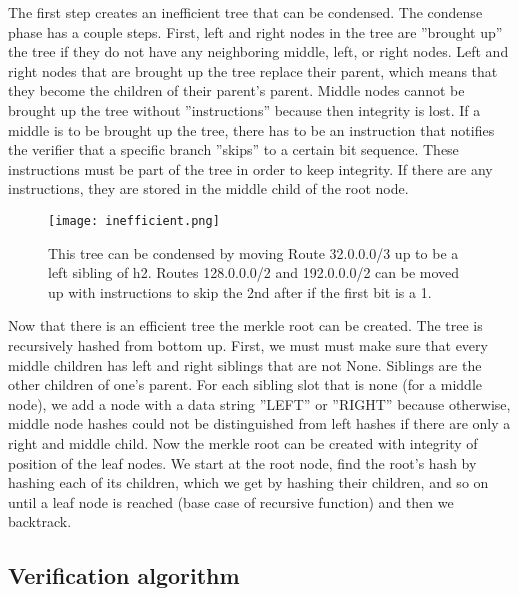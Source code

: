 \documentclass[letterpaper, 10 pt, conference]{ieeeconf}  %
\begin{document}
The first step creates an inefficient tree that can be condensed. The condense phase has a couple steps. First, left and right nodes in the tree are ”brought up” the tree if they do not have any neighboring middle, left, or right nodes. Left and right nodes that are brought up the tree replace their parent, which means that they become the children of their parent’s parent. Middle nodes cannot be brought up the tree without ”instructions” because then integrity is lost. If a middle is to be brought up the tree, there has to be an instruction that notifies the verifier that a specific branch ”skips” to a certain bit sequence. These instructions must be part of the tree in order to keep integrity. If there are any instructions, they are stored in the middle child of the root node. 

\begin{figure}[!ht]
	\centering
	\texttt{[image: inefficient.png]}
    \caption{This tree can be condensed by moving Route 32.0.0.0/3 up to be a left sibling of h2. Routes 128.0.0.0/2 and 192.0.0.0/2 can be moved up with instructions to skip the 2nd after if the first bit is a 1.}
    \end{figure}

Now that there is an efficient tree the merkle root can be created. The tree is recursively hashed from bottom up. First, we must must make sure that every middle children has left and right siblings that are not None. Siblings are the other children of one’s parent. For each sibling slot that is none (for a middle node), we add a node with a data string ”LEFT” or ”RIGHT” because otherwise, middle node hashes could not be distinguished from left hashes if there are only a right and middle child. Now the merkle root can be created with integrity of position of the leaf nodes. We start at the root node, find the root’s hash by hashing each of its children, which we get by hashing their children, and so on until a leaf node is reached (base case of recursive function) and then we backtrack. 

\subsection{Verification algorithm}
\end{document}
